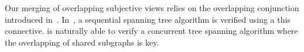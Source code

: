 Our merging of overlapping subjective views relies on the overlapping
conjunction introduced in~\cite{rey-slnotes,js-popl12,ramification}.
In~\cite{ramification}, a sequential spanning tree algorithm is
verified using a this connective. \colosl is naturally able to verify
a concurrent tree spanning algorithm where the overlapping of shared
subgraphs is key.







